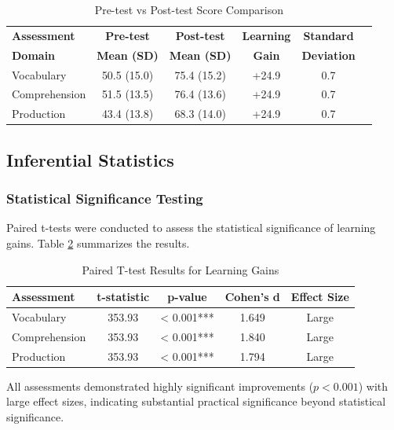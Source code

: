 \documentclass[12pt,a4paper]{article}
\begin{document}
\begin{table}[H]
\centering
\caption{Pre-test vs Post-test Score Comparison}
\label{tab:prepost}
\begin{tabular}{lccccc}
\toprule
\textbf{Assessment} & \textbf{Pre-test} & \textbf{Post-test} & \textbf{Learning} & \textbf{Standard} \\
\textbf{Domain} & \textbf{Mean (SD)} & \textbf{Mean (SD)} & \textbf{Gain} & \textbf{Deviation} \\
\midrule
Vocabulary & 50.5 (15.0) & 75.4 (15.2) & +24.9 & 0.7 \\
Comprehension & 51.5 (13.5) & 76.4 (13.6) & +24.9 & 0.7 \\
Production & 43.4 (13.8) & 68.3 (14.0) & +24.9 & 0.7 \\
\bottomrule
\end{tabular}
\end{table}

\subsection{Inferential Statistics}

\subsubsection{Statistical Significance Testing}

Paired t-tests were conducted to assess the statistical significance of learning gains. Table \ref{tab:ttests} summarizes the results.

\begin{table}[H]
\centering
\caption{Paired T-test Results for Learning Gains}
\label{tab:ttests}
\begin{tabular}{lcccc}
\toprule
\textbf{Assessment} & \textbf{t-statistic} & \textbf{p-value} & \textbf{Cohen's d} & \textbf{Effect Size} \\
\midrule
Vocabulary & 353.93 & < 0.001*** & 1.649 & Large \\
Comprehension & 353.93 & < 0.001*** & 1.840 & Large \\
Production & 353.93 & < 0.001*** & 1.794 & Large \\
\bottomrule
\end{tabular}
\end{table}

All assessments demonstrated highly significant improvements ($p < 0.001$) with large effect sizes, indicating substantial practical significance beyond statistical significance.
\end{document}
